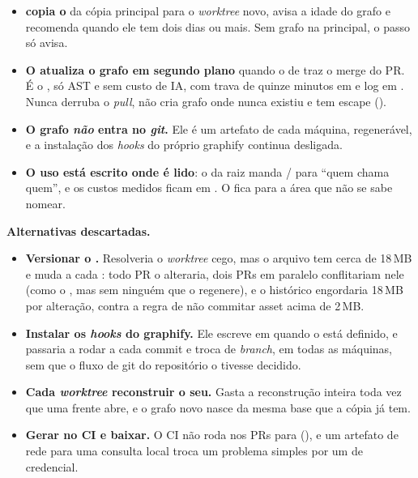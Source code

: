 \begin{itemize}
  \item \textbf{ copia o } da cópia principal para
    o \emph{worktree} novo, avisa a idade do grafo e recomenda 
    quando ele tem dois dias ou mais. Sem grafo na principal, o passo só avisa.
  \item \textbf{O  atualiza o grafo em segundo plano} quando o
     de  traz o merge do PR. É o , só
    AST e sem custo de IA, com trava de quinze minutos em
     e log em . Nunca
    derruba o \emph{pull}, não cria grafo onde nunca existiu e tem escape
    ().
  \item \textbf{O grafo \emph{não} entra no \emph{git}.} Ele é um artefato de cada
    máquina, regenerável, e a instalação dos \emph{hooks} do próprio graphify continua
    desligada.
  \item \textbf{O uso está escrito onde é lido}: o  da raiz manda
    / para \enquote{quem chama quem}, e os custos medidos ficam em
    . O  fica para a área que não se sabe nomear.
\end{itemize}

\textbf{Alternativas descartadas.}

\begin{itemize}
  \item \textbf{Versionar o .} Resolveria o \emph{worktree} cego, mas o
    arquivo tem cerca de 18\,MB e muda a cada : todo PR o alteraria, dois PRs
    em paralelo conflitariam nele (como o , mas sem ninguém que o
    regenere), e o histórico engordaria 18\,MB por alteração, contra a regra de não
    commitar asset acima de 2\,MB.
  \item \textbf{Instalar os \emph{hooks} do graphify.} Ele escreve em 
    quando o  está definido, e passaria a rodar a cada commit e
    troca de \emph{branch}, em todas as máquinas, sem que o fluxo de git do repositório
    o tivesse decidido.
  \item \textbf{Cada \emph{worktree} reconstruir o seu.} Gasta a reconstrução inteira
    toda vez que uma frente abre, e o grafo novo nasce da mesma base que a cópia já tem.
  \item \textbf{Gerar no CI e baixar.} O CI não roda nos PRs para 
    (), e um artefato de rede para uma consulta local troca um problema
    simples por um de credencial.
\end{itemize}


